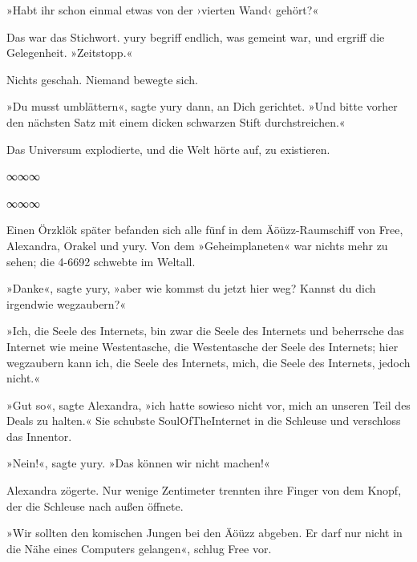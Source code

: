 »Habt ihr schon einmal etwas von der ›vierten Wand‹ gehört?«

Das war das Stichwort. yury begriff endlich, was gemeint war, und ergriff die Gelegenheit. »Zeitstopp.«

Nichts geschah. Niemand bewegte sich.

»Du musst umblättern«, sagte yury dann, an Dich gerichtet. »Und bitte vorher den nächsten Satz mit einem dicken schwarzen Stift durchstreichen.«

Das Universum explodierte, und die Welt hörte auf, zu existieren.

\begin{center}
    ∞∞∞
\end{center}

\cleardoubleevenplainpage
\cleardoubleoddplainpage
\cleardoubleevenplainpage

\begin{center}
    ∞∞∞
\end{center}

Einen Örzklök später befanden sich alle fünf in dem Äöüzz-Raumschiff von Free, Alexandra, Orakel und yury. Von dem »Geheimplaneten« war nichts mehr zu sehen; die 4-6692 schwebte im Weltall.

»Danke«, sagte yury, »aber wie kommst du jetzt hier weg? Kannst du dich irgendwie wegzaubern?«

»Ich, die Seele des Internets, bin zwar die Seele des Internets und beherrsche das Internet wie meine Westentasche, die Westentasche der Seele des Internets; hier wegzaubern kann ich, die Seele des Internets, mich, die Seele des Internets, jedoch nicht.«

»Gut so«, sagte Alexandra, »ich hatte sowieso nicht vor, mich an unseren Teil des Deals zu halten.« Sie schubste SoulOfTheInternet in die Schleuse und verschloss das Innentor.

»Nein!«, sagte yury. »Das können wir nicht machen!«

Alexandra zögerte. Nur wenige Zentimeter trennten ihre Finger von dem Knopf, der die Schleuse nach außen öffnete.

»Wir sollten den komischen Jungen bei den Äöüzz abgeben. Er darf nur nicht in die Nähe eines Computers gelangen«, schlug Free vor.

